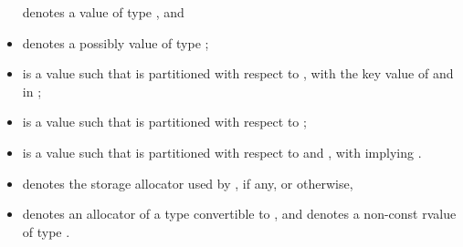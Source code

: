 \documentclass{wg21}
\begin{document}
\begin{itemize}
     denotes a value of type , and
    \item
     denotes a possibly  value of type ;
    \item
     is a value such that  is partitioned
    with respect to , with  the key value of 
    and  in ;
    \item
     is a value such that  is partitioned with respect to
    ;
    \item
     is a value such that  is partitioned with respect to
     and , with  implying
    .
    \item
     denotes the storage allocator used by , if any, or  otherwise,
    \item
     denotes an allocator of a type convertible to ,
    and  denotes a non-const rvalue of type .
\end{itemize}

\newcommand{\indexordmem}[1]{%
    \indexlibrary{\idxcode{#1}!ordered associative containers}%
    \indexlibrary{\idxcode{set}!\idxcode{#1}}%
    \indexlibrary{\idxcode{map}!\idxcode{#1}}%
    \indexlibrary{\idxcode{multiset}!\idxcode{#1}}%
    \indexlibrary{\idxcode{multimap}!\idxcode{#1}}%
}
\end{document}
